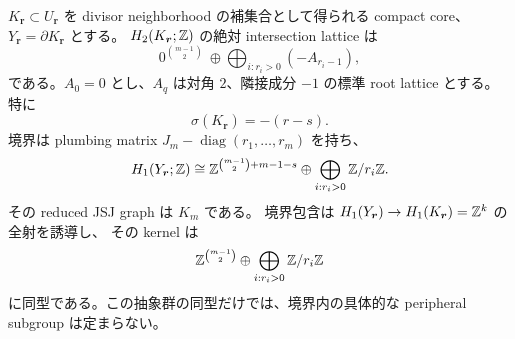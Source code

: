 \begin{proposition}
\label{cs7:lattice}
$K_{\boldsymbol r}\subset U_{\boldsymbol r}$ を divisor neighborhood の補集合として得られる
compact core、$Y_{\boldsymbol r}=\partial K_{\boldsymbol r}$ とする。
$H_2(K_{\boldsymbol r};\mathbb Z)$ の絶対 intersection lattice は
\begin{equation}\label{cs7:intersection}
 0^{\binom{m-1}{2}}\ \oplus\!
 \bigoplus_{i:r_i>0}(-A_{r_i-1}),
\end{equation}
である。$A_0=0$ とし、$A_q$ は対角 $2$、隣接成分 $-1$ の標準 root lattice とする。
特に
\[
 \sigma(K_{\boldsymbol r})=-(r-s).
\]
境界は plumbing matrix $J_m-\operatorname{diag}(r_1,\ldots,r_m)$ を持ち、
\begin{equation}\label{cs7:boundary-h1}
 H_1(Y_{\boldsymbol r};\mathbb Z)\cong
 \mathbb Z^{\binom{m-1}{2}+m-1-s}
 \oplus\bigoplus_{i:r_i>0}\mathbb Z/r_i\mathbb Z.
\end{equation}
その reduced JSJ graph は $K_m$ である。
境界包含は $H_1(Y_{\boldsymbol r})\to H_1(K_{\boldsymbol r})=\mathbb Z^k$ の全射を誘導し、
その kernel は
\[
 \mathbb Z^{\binom{m-1}{2}}\oplus\bigoplus_{i:r_i>0}\mathbb Z/r_i\mathbb Z
\]
に同型である。この抽象群の同型だけでは、境界内の具体的な peripheral subgroup は定まらない。
\end{proposition}

